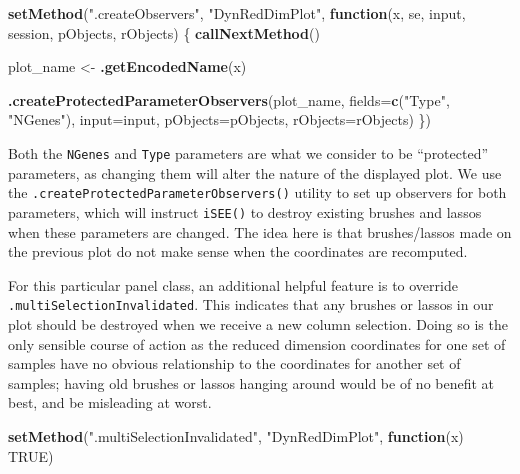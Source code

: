 \documentclass[
]{book}
\newenvironment{Shaded}{\begin{snugshade}}{\end{snugshade}}
\newcommand{\ControlFlowTok}[1]{\textcolor[rgb]{0.13,0.29,0.53}{\textbf{#1}}}
\newcommand{\DataTypeTok}[1]{\textcolor[rgb]{0.13,0.29,0.53}{#1}}
\newcommand{\KeywordTok}[1]{\textcolor[rgb]{0.13,0.29,0.53}{\textbf{#1}}}
\newcommand{\NormalTok}[1]{#1}
\newcommand{\OtherTok}[1]{\textcolor[rgb]{0.56,0.35,0.01}{#1}}
\newcommand{\StringTok}[1]{\textcolor[rgb]{0.31,0.60,0.02}{#1}}
\begin{document}
\begin{Shaded}
\begin{Highlighting}[]
\KeywordTok{setMethod}\NormalTok{(}\StringTok{".createObservers"}\NormalTok{, }\StringTok{"DynRedDimPlot"}\NormalTok{, }
    \ControlFlowTok{function}\NormalTok{(x, se, input, session, pObjects, rObjects) }
\NormalTok{\{}
    \KeywordTok{callNextMethod}\NormalTok{()}

\NormalTok{    plot_name <-}\StringTok{ }\KeywordTok{.getEncodedName}\NormalTok{(x)}

    \KeywordTok{.createProtectedParameterObservers}\NormalTok{(plot_name,}
        \DataTypeTok{fields=}\KeywordTok{c}\NormalTok{(}\StringTok{"Type"}\NormalTok{, }\StringTok{"NGenes"}\NormalTok{),}
        \DataTypeTok{input=}\NormalTok{input, }\DataTypeTok{pObjects=}\NormalTok{pObjects, }\DataTypeTok{rObjects=}\NormalTok{rObjects)}
\NormalTok{\})}
\end{Highlighting}
\end{Shaded}

Both the \texttt{NGenes} and \texttt{Type} parameters are what we consider to be ``protected'' parameters,
as changing them will alter the nature of the displayed plot.
We use the \texttt{.createProtectedParameterObservers()} utility to set up observers for both parameters,
which will instruct \texttt{iSEE()} to destroy existing brushes and lassos when these parameters are changed.
The idea here is that brushes/lassos made on the previous plot do not make sense when the coordinates are recomputed.

For this particular panel class, an additional helpful feature is to override \texttt{.multiSelectionInvalidated}.
This indicates that any brushes or lassos in our plot should be destroyed when we receive a new column selection.
Doing so is the only sensible course of action as the reduced dimension coordinates for one set of samples have no obvious relationship to the coordinates for another set of samples;
having old brushes or lassos hanging around would be of no benefit at best, and be misleading at worst.

\begin{Shaded}
\begin{Highlighting}[]
\KeywordTok{setMethod}\NormalTok{(}\StringTok{".multiSelectionInvalidated"}\NormalTok{, }\StringTok{"DynRedDimPlot"}\NormalTok{, }\ControlFlowTok{function}\NormalTok{(x) }\OtherTok{TRUE}\NormalTok{)}
\end{Highlighting}
\end{Shaded}
\end{document}
